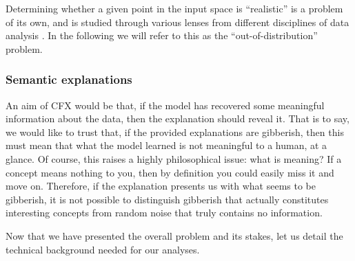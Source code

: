 \documentclass[../main.tex]{subfiles}
\begin{document}
Determining whether a given point in the input space is ``realistic'' is a problem of its own, and is studied through various lenses from different disciplines of data analysis \cite{yangGeneralized2022}.
In the following we will refer to this as the ``out-of-distribution'' problem.

\subsubsection{Semantic explanations}
\label{intro/semanticity_problem}



An aim of CFX would be that, if the model has recovered some meaningful information about the data, then the explanation should reveal it. That is to say, we would like to trust that, if the provided explanations are gibberish, then this must mean that what the model learned is not meaningful to a human, at a glance.
Of course, this raises a highly philosophical issue: what is meaning? 
If a concept means nothing to you, then by definition you could easily miss it and move on.
Therefore, if the explanation presents us with what seems to be gibberish, it is not possible to distinguish gibberish that actually constitutes interesting concepts from random noise that truly contains no information.


Now that we have presented the overall problem and its stakes, let us detail the technical background needed for our analyses.
\end{document}
